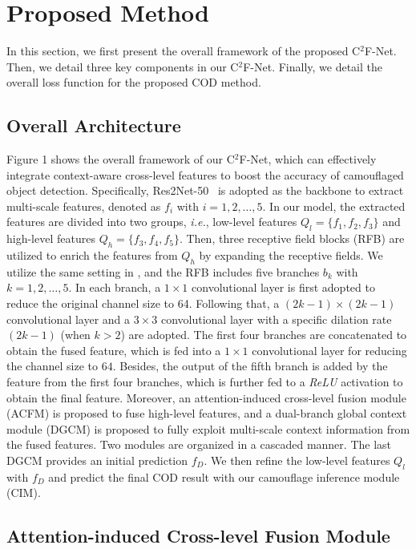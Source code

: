 \documentclass[lettersize,journal]{IEEEtran}
\newcommand{\figref}[1]{Figure 1}%
\newcommand{\figref}[1]{Fig.~\ref{#1}}%
\newcommand{\ourM}{{C$^2$F-Net}}
\def\ie{\emph{i.e.}}
\begin{document}
\section{Proposed Method}\label{Methods}

In this section, we first present the overall framework of the proposed \ourM. Then, we detail three key components in our \ourM. Finally, we detail the overall loss function for the proposed COD method.

\subsection{Overall Architecture} 

\figref{fig:net1} shows the overall framework of our \ourM, which can effectively integrate context-aware cross-level features to boost the accuracy of camouflaged object detection. Specifically,  Res2Net-50~\cite{res2net} is adopted as the backbone to extract multi-scale features, denoted as $f_i$ with $i=1,2,\dots,5$.
In our model, the extracted features are divided into two groups, \ie, low-level features $Q_l = \{f_1,f_2,f_3\}$ and high-level features $Q_h = \{f_3,f_4,f_5\}$.
Then, three receptive field blocks (RFB) are utilized to enrich the features from $Q_h$ by expanding the receptive fields. We utilize the same setting in \cite{res2net}, and the RFB includes five branches $b_k$ with $k=1,2,\dots,5$. In each branch, a $1\times{1}$ convolutional layer is first adopted to reduce the original channel size to 64. Following that, a $(2k-1)\times(2k-1)$ convolutional layer and a $3\times{3}$ convolutional layer with a specific dilation rate $(2k-1)$ (when $k>2$) are adopted. The first four branches are concatenated to obtain the fused feature, which is fed into a $1\times{1}$ convolutional layer for reducing the channel size to $64$. Besides, the output of the fifth branch is added by the feature from the first four branches, which is further fed to a \emph{ReLU} activation to obtain the final feature. Moreover, an attention-induced cross-level fusion module (ACFM) is proposed to fuse high-level features, and a dual-branch global context module (DGCM) is proposed to fully exploit multi-scale context information from the fused features. Two modules are organized in a cascaded manner. The last DGCM provides an initial prediction $f_D$. We then refine the low-level features $Q_l$ with $f_D$ and predict the final COD result with our camouflage inference module (CIM).
\subsection{Attention-induced Cross-level Fusion Module}
\end{document}
